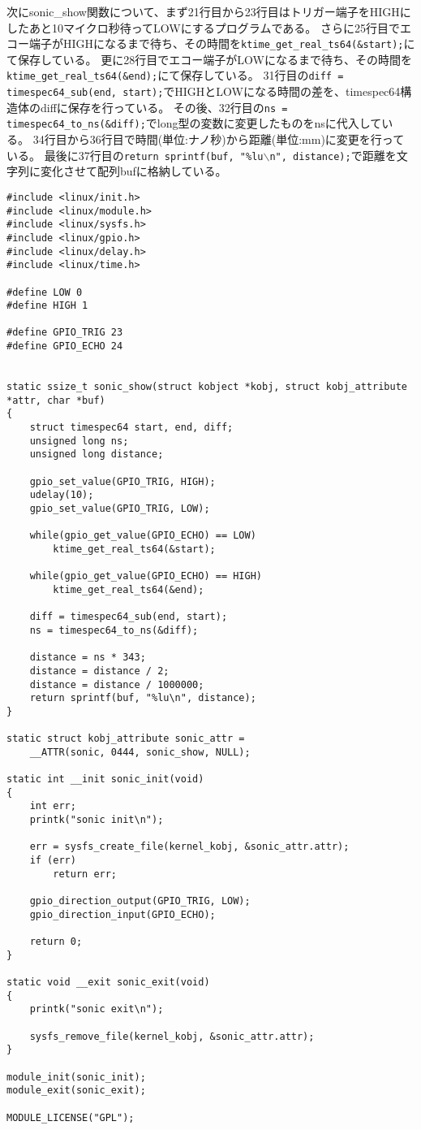 \documentclass[dvipdfmx]{jsarticle}
\begin{document}
次にsonic\_show関数について、まず21行目から23行目はトリガー端子をHIGHにしたあと10マイクロ秒待ってLOWにするプログラムである。
さらに25行目でエコー端子がHIGHになるまで待ち、その時間を\texttt{ktime\_get\_real\_ts64(\&start);}にて保存している。
更に28行目でエコー端子がLOWになるまで待ち、その時間を\texttt{ktime\_get\_real\_ts64(\&end);}にて保存している。
31行目の\texttt{diff = timespec64\_sub(end, start);}でHIGHとLOWになる時間の差を、timespec64構造体のdiffに保存を行っている。
その後、32行目の\texttt{ns = timespec64\_to\_ns(\&diff);}でlong型の変数に変更したものをnsに代入している。
34行目から36行目で時間(単位:ナノ秒)から距離(単位:mm)に変更を行っている。
最後に37行目の\texttt{return sprintf(buf, "\%lu$\backslash$n", distance);}で距離を文字列に変化させて配列bufに格納している。


\newpage

\begin{lstlisting}[caption={sonic.c}]
#include <linux/init.h>
#include <linux/module.h>
#include <linux/sysfs.h>
#include <linux/gpio.h>
#include <linux/delay.h>
#include <linux/time.h>

#define LOW 0
#define HIGH 1

#define GPIO_TRIG 23
#define GPIO_ECHO 24


static ssize_t sonic_show(struct kobject *kobj, struct kobj_attribute *attr, char *buf)
{
    struct timespec64 start, end, diff;
    unsigned long ns;
    unsigned long distance;

    gpio_set_value(GPIO_TRIG, HIGH);
    udelay(10);
    gpio_set_value(GPIO_TRIG, LOW);

    while(gpio_get_value(GPIO_ECHO) == LOW)
        ktime_get_real_ts64(&start);

    while(gpio_get_value(GPIO_ECHO) == HIGH)
        ktime_get_real_ts64(&end);

    diff = timespec64_sub(end, start);
    ns = timespec64_to_ns(&diff);
    
    distance = ns * 343;
    distance = distance / 2;
    distance = distance / 1000000;
    return sprintf(buf, "%lu\n", distance);
}

static struct kobj_attribute sonic_attr =
    __ATTR(sonic, 0444, sonic_show, NULL);

static int __init sonic_init(void)
{
    int err;    
    printk("sonic init\n");

    err = sysfs_create_file(kernel_kobj, &sonic_attr.attr);
    if (err)
        return err;

    gpio_direction_output(GPIO_TRIG, LOW);
    gpio_direction_input(GPIO_ECHO);

    return 0;
}

static void __exit sonic_exit(void)
{
    printk("sonic exit\n");

    sysfs_remove_file(kernel_kobj, &sonic_attr.attr);
}

module_init(sonic_init);
module_exit(sonic_exit);

MODULE_LICENSE("GPL");

\end{lstlisting}
\end{document}

